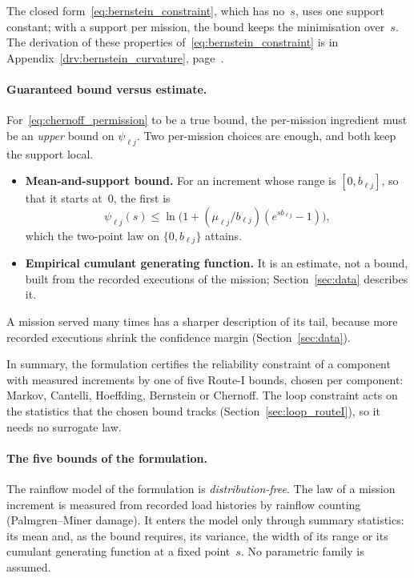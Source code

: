 \documentclass[11pt,a4paper]{article}
\theoremstyle{plain}
\theoremstyle{definition}
\theoremstyle{remark}
\begin{document}
The closed form~\eqref{eq:bernstein_constraint}, which has no~$s$, uses one support constant; with a support per mission, the bound keeps the minimisation over~$s$.
The derivation of these properties of~\eqref{eq:bernstein_constraint} is in Appendix~\ref{drv:bernstein_curvature}, page~\pageref{drv:bernstein_curvature}.

\paragraph{Guaranteed bound versus estimate.}
For~\eqref{eq:chernoff_permission} to be a true bound, the per-mission ingredient must be an \emph{upper} bound on $\psi_{\ell j}$.
Two per-mission choices are enough, and both keep the support local.
\begin{itemize}
  \item \textbf{Mean-and-support bound.} For an increment whose range is $[0, b_{\ell j}]$, so that it starts at~$0$, the first is
    \begin{equation}
      \psi_{\ell j}(s) \le \ln\!\big( 1 + (\mu_{\ell j}/b_{\ell j})(e^{s b_{\ell j}} - 1) \big),
    \end{equation}
    which the two-point law on $\{0, b_{\ell j}\}$ attains.
  \item \textbf{Empirical cumulant generating function.} It is an estimate, not a bound, built from the recorded executions of the mission; Section~\ref{sec:data} describes it.
\end{itemize}
A mission served many times has a sharper description of its tail, because more recorded executions shrink the confidence margin (Section~\ref{sec:data}).

In summary, the formulation certifies the reliability constraint of a component with measured increments by one of five Route-I bounds, chosen per component: Markov, Cantelli, Hoeffding, Bernstein or Chernoff.
The loop constraint acts on the statistics that the chosen bound tracks (Section~\ref{sec:loop_routeI}), so it needs no surrogate law.

\paragraph{The five bounds of the formulation.}
The rainflow model of the formulation is \emph{distribution-free}.
The law of a mission increment is measured from recorded load histories by rainflow counting (Palmgren--Miner damage).
It enters the model only through summary statistics: its mean and, as the bound requires, its variance, the width of its range or its cumulant generating function at a fixed point~$s$.
No parametric family is assumed.
\end{document}
